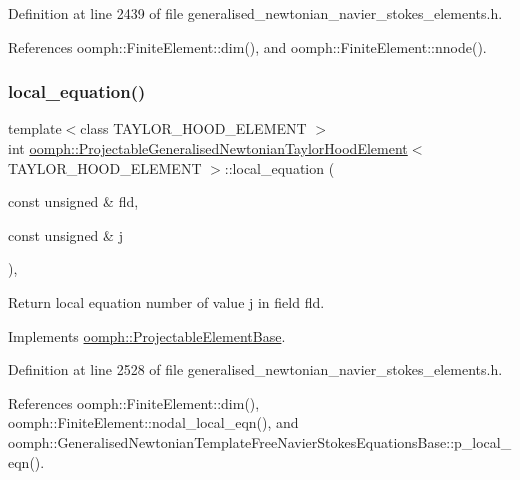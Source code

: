 Definition at line 2439 of file generalised\+\_\+newtonian\+\_\+navier\+\_\+stokes\+\_\+elements.\+h.



References oomph\+::\+Finite\+Element\+::dim(), and oomph\+::\+Finite\+Element\+::nnode().

\mbox{\label{classoomph_1_1ProjectableGeneralisedNewtonianTaylorHoodElement_aade79476ead53af48e508562033bfb50}} 
\subsubsection{\texorpdfstring{local\+\_\+equation()}{local\_equation()}}
{\footnotesize\ttfamily template$<$class T\+A\+Y\+L\+O\+R\+\_\+\+H\+O\+O\+D\+\_\+\+E\+L\+E\+M\+E\+NT $>$ \\
int \hyperlink{classoomph_1_1ProjectableGeneralisedNewtonianTaylorHoodElement}{oomph\+::\+Projectable\+Generalised\+Newtonian\+Taylor\+Hood\+Element}$<$ T\+A\+Y\+L\+O\+R\+\_\+\+H\+O\+O\+D\+\_\+\+E\+L\+E\+M\+E\+NT $>$\+::local\+\_\+equation (\begin{DoxyParamCaption}\item[{const unsigned \&}]{fld,  }\item[{const unsigned \&}]{j }\end{DoxyParamCaption})\hspace{0.3cm}{\ttfamily [inline]}, {\ttfamily [virtual]}}



Return local equation number of value j in field fld. 



Implements \hyperlink{classoomph_1_1ProjectableElementBase_ac5c27ae929ff636dc7747fe23fd4f738}{oomph\+::\+Projectable\+Element\+Base}.



Definition at line 2528 of file generalised\+\_\+newtonian\+\_\+navier\+\_\+stokes\+\_\+elements.\+h.



References oomph\+::\+Finite\+Element\+::dim(), oomph\+::\+Finite\+Element\+::nodal\+\_\+local\+\_\+eqn(), and oomph\+::\+Generalised\+Newtonian\+Template\+Free\+Navier\+Stokes\+Equations\+Base\+::p\+\_\+local\+\_\+eqn().

